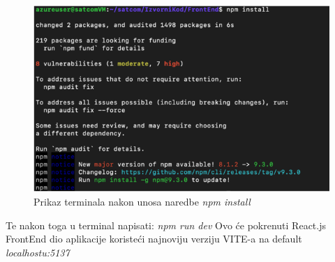 			
			
			\begin{figure}[H]
				\includegraphics[width=\textwidth]{slike/npm install.PNG} %
				\centering
				\caption{Prikaz terminala nakon unosa naredbe \textit{npm install} }
				\label{fig:npminstall1}
			\end{figure}
			
			
 	
            Te nakon toga u terminal napisati: 
            \textit{npm run dev}
            Ovo će pokrenuti React.js FrontEnd dio aplikacije koristeći najnoviju verziju VITE-a na default \textit{localhostu:5137}
